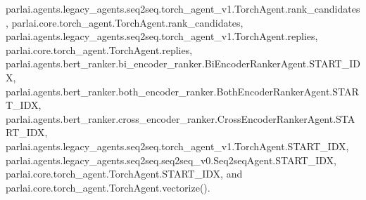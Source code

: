 parlai.\+agents.\+legacy\+\_\+agents.\+seq2seq.\+torch\+\_\+agent\+\_\+v1.\+Torch\+Agent.\+rank\+\_\+candidates, parlai.\+core.\+torch\+\_\+agent.\+Torch\+Agent.\+rank\+\_\+candidates, parlai.\+agents.\+legacy\+\_\+agents.\+seq2seq.\+torch\+\_\+agent\+\_\+v1.\+Torch\+Agent.\+replies, parlai.\+core.\+torch\+\_\+agent.\+Torch\+Agent.\+replies, parlai.\+agents.\+bert\+\_\+ranker.\+bi\+\_\+encoder\+\_\+ranker.\+Bi\+Encoder\+Ranker\+Agent.\+S\+T\+A\+R\+T\+\_\+\+I\+DX, parlai.\+agents.\+bert\+\_\+ranker.\+both\+\_\+encoder\+\_\+ranker.\+Both\+Encoder\+Ranker\+Agent.\+S\+T\+A\+R\+T\+\_\+\+I\+DX, parlai.\+agents.\+bert\+\_\+ranker.\+cross\+\_\+encoder\+\_\+ranker.\+Cross\+Encoder\+Ranker\+Agent.\+S\+T\+A\+R\+T\+\_\+\+I\+DX, parlai.\+agents.\+legacy\+\_\+agents.\+seq2seq.\+torch\+\_\+agent\+\_\+v1.\+Torch\+Agent.\+S\+T\+A\+R\+T\+\_\+\+I\+DX, parlai.\+agents.\+legacy\+\_\+agents.\+seq2seq.\+seq2seq\+\_\+v0.\+Seq2seq\+Agent.\+S\+T\+A\+R\+T\+\_\+\+I\+DX, parlai.\+core.\+torch\+\_\+agent.\+Torch\+Agent.\+S\+T\+A\+R\+T\+\_\+\+I\+DX, and parlai.\+core.\+torch\+\_\+agent.\+Torch\+Agent.\+vectorize().

